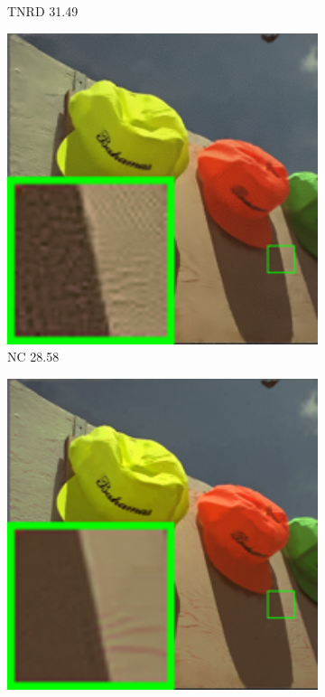\begin{figure}
\begin{subfigure}[t]{0.19\textwidth}
\caption{TNRD 31.49}
    \end{subfigure}
    \hfill
    \begin{subfigure}[t]{0.19\textwidth}
        \centering
        \includegraphics[width=1\textwidth]{images/mcwnnm/24images/resize_br_NC_nSig402030_kodim03.png}
		\caption{NC 28.58}
    \end{subfigure}
    \hfill
    \begin{subfigure}[t]{0.19\textwidth}
        \centering
        \includegraphics[width=1\textwidth]{images/mcwnnm/24images/resize_br_WNNMCW_nSig402030_kodim03.png}

\end{subfigure}
\end{figure}
